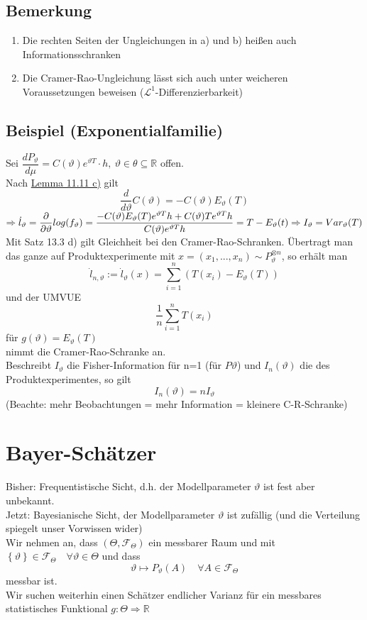 \documentclass[german,10pt,oneside, fleqn, a4paper]{article}
\newcommand {\R}	{\mathbb{R}}
\newcommand{\Ra}	{\Rightarrow}
\newcommand{\sm}[2][\infty]{\sum\limits_{#2}^{#1}}
\newcommand{\brac}[1]{\left\lbrace #1\right\rbrace}
\newcommand{\mc}[1]{\mathcal{#1}}
\newcommand{\lp}[1]{\mc{L}^{#1}}
\newcommand{\1}[1]{1_{#1}}
\newcommand{\2}[1]{\1{\brac{#1}}}
\newcommand{\f}{\mc{F}}
\newcommand{\sumi}{\sm[n]{i=1}}
\newcommand{\qf}{\quad\forall}
\newcommand{\stuff}{{\otimes n}}
\begin{document}
\subsection{Bemerkung}
\label{13.4}
\begin{enumerate}[label=(\roman*)]
\item Die rechten Seiten der Ungleichungen in a) und b) heißen auch\\ Informationsschranken
\item Die Cramer-Rao-Ungleichung lässt sich auch unter weicheren Voraussetzungen beweisen (\grqq$\lp{1}$-Differenzierbarkeit\grqq)
\end{enumerate}

\subsection{Beispiel (Exponentialfamilie)}
\label{13.5}
Sei $\dfrac{dP_\vartheta}{d\mu}=C(\vartheta)e^{\vartheta T}\cdot h,\ \vartheta\in\theta\subseteq\R$ offen.\\
Nach \hyperref[11.11]{Lemma 11.11 c)} gilt\[
\dfrac{d}{d\vartheta}C(\vartheta)=-C(\vartheta)E_\vartheta(T)\]
$\Ra \dot l_\vartheta=\dfrac{\partial}{\partial\vartheta}log(f_\vartheta)=\dfrac{-C(\vartheta)E_\vartheta(T)e^{\vartheta T}h+C(\vartheta)Te^{\vartheta T}h}{C(\vartheta)e^{\vartheta T}h}=T-E_\vartheta(t)\\
\Ra I_\vartheta=Var_\vartheta(T)$\\
Mit Satz 13.3 d) gilt Gleichheit bei den Cramer-Rao-Schranken.
Übertragt man das ganze auf Produktexperimente mit $x=(x_1,...,x_n)\sim P_\vartheta^\stuff$, so erhält man \[\dot l_{n,\vartheta}:=\dot l_\vartheta(x)=\sumi(T(x_i)-E_\vartheta(T))\]
und der  UMVUE\[
\dfrac{1}{n}\sumi T(x_i)\]
für $g(\vartheta)=E_\vartheta(T)$\\
nimmt die Cramer-Rao-Schranke an.\\
Beschreibt $I_\vartheta$ die Fisher-Information für n=1 (für $P\vartheta$) und $I_n(\vartheta)$ die des Produktexperimentes, so gilt\[I_n(\vartheta)=nI_\vartheta\]
(Beachte: mehr Beobachtungen = mehr Information = kleinere C-R-Schranke)


\pagebreak
\section{Bayer-Schätzer}
Bisher: Frequentistische Sicht, d.h. der Modellparameter $\vartheta$ ist fest aber unbekannt.\\
Jetzt: Bayesianische Sicht, der Modellparameter $\vartheta$ ist zufällig (und die Verteilung spiegelt unser Vorwissen wider)\\
Wir nehmen an, dass $(\Theta,\f_\Theta)$ ein messbarer Raum und mit $\brac{\vartheta}\in\f_\Theta\qf\vartheta\in\Theta$ und dass \[\vartheta\mapsto P_\vartheta(A)\qf A\in\f_\Theta\]
messbar ist. \\
Wir suchen weiterhin einen Schätzer endlicher Varianz für ein messbares statistisches Funktional $g:\Theta\Ra\R$
\end{document}
